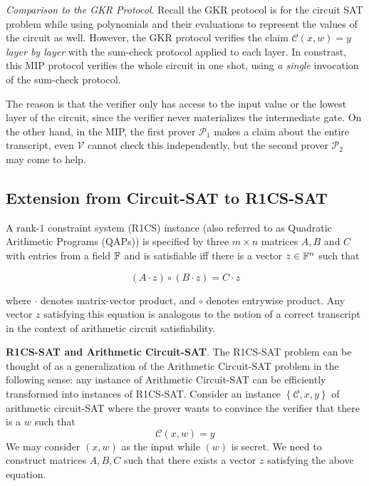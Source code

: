 \documentclass{article}
\begin{document}
\textit{Comparison to the GKR Protocol}. Recall the GKR protocol is for the circuit SAT problem while using polynomials and their evaluations to represent the values of the circuit as well. However, the GKR protocol verifies the claim $\mathcal{C}(x, w) = y$ \textit{layer by layer} with the sum-check protocol applied to each layer. In constrast, this MIP protocol verifies the whole circuit in one shot, using \textit{a single} invocation of the sum-check protocol. 

The reason is that the verifier only has access to the input value or the lowest layer of the circuit, since the verifier never materializes the intermediate gate. On the other hand, in the MIP, the first prover $\mathcal{P}_1$ makes a claim about the entire transcript, even $\mathcal{V}$ cannot check this independently, but the second prover $\mathcal{P}_2$ may come to help. 

\subsection{Extension from Circuit-SAT to R1CS-SAT}

\begin{boxx1}
A rank-$1$ constraint system (R1CS) instance (also referred to as Quadratic Arithmetic Programs (QAPs)) is specified by three $m \times n$ matrices $A, B$ and $C$ with entries from a field $\mathbb{F}$ and is satisfiable iff there is a vector $z \in \mathbb{F}^n$ such that 

\begin{equation} \label{eq:r1cs}
(A \cdot z) \circ (B \cdot z) = C \cdot z
\end{equation}

where $\cdot$ denotes matrix-vector product, and $\circ$ denotes entrywise product. Any vector $z$ satisfying this equation is analogous to the notion of a correct transcript in the context of arithmetic circuit satisfiability. 

\end{boxx1}

\textbf{R1CS-SAT and Arithmetic Circuit-SAT}. The R1CS-SAT problem can be thought of as a generalization of the Arithmetic Circuit-SAT problem in the following sense: any instance of Arithmetic Circuit-SAT can be efficiently transformed into instances of R1CS-SAT. Consider an instance $\left\{ \mathcal{C}, x, y \right\}$ of arithmetic circuit-SAT where the prover wants to convince the verifier that there is a $w$ such that
\begin{equation*}
\mathcal{C}(x, w) = y
\end{equation*}
We may consider $(x, w)$ as the input while $(w)$ is secret. We need to construct matrices $A, B, C$ such that there exists a vector $z$ satisfying the above equation. 
\end{document}
